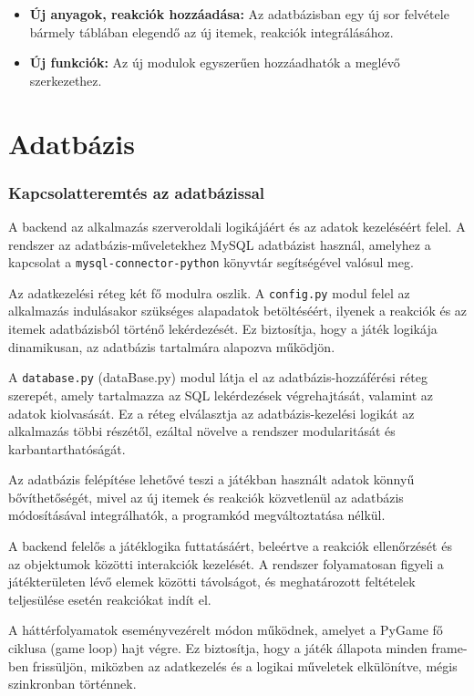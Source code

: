 \documentclass[]{thesis-ekf}
\begin{document}
	\begin{itemize}
		\item \textbf{Új anyagok, reakciók hozzáadása:} Az adatbázisban egy új sor felvétele bármely táblában elegendő az új itemek, reakciók integrálásához.
		
		\item \textbf{Új funkciók:} Az új modulok egyszerűen hozzáadhatók a meglévő szerkezethez.
	\end{itemize}
	
	\section{Adatbázis}
	\subsubsection{Kapcsolatteremtés az adatbázissal}
	
	A backend az alkalmazás szerveroldali logikájáért és az adatok kezeléséért felel. A rendszer az adatbázis-műveletekhez MySQL adatbázist használ, amelyhez a kapcsolat a \texttt{mysql-connector-python} könyvtár segítségével valósul meg.
	
	Az adatkezelési réteg két fő modulra oszlik. A \texttt{config.py} modul felel az alkalmazás indulásakor szükséges alapadatok betöltéséért, ilyenek a reakciók és az itemek adatbázisból történő lekérdezését. Ez biztosítja, hogy a játék logikája dinamikusan, az adatbázis tartalmára alapozva működjön.
	
	A \texttt{database.py} (dataBase.py) modul látja el az adatbázis-hozzáférési réteg szerepét, amely tartalmazza az SQL lekérdezések végrehajtását, valamint az adatok kiolvasását. Ez a réteg elválasztja az adatbázis-kezelési logikát az alkalmazás többi részétől, ezáltal növelve a rendszer modularitását és karbantarthatóságát.
	
	Az adatbázis felépítése lehetővé teszi a játékban használt adatok könnyű bővíthetőségét, mivel az új itemek és reakciók közvetlenül az adatbázis módosításával integrálhatók, a programkód megváltoztatása nélkül.
	
	A backend felelős a játéklogika futtatásáért, beleértve a reakciók ellenőrzését és az objektumok közötti interakciók kezelését. A rendszer folyamatosan figyeli a játékterületen lévő elemek közötti távolságot, és meghatározott feltételek teljesülése esetén reakciókat indít el.
	
	A háttérfolyamatok eseményvezérelt módon működnek, amelyet a PyGame fő ciklusa (game loop) hajt végre. Ez biztosítja, hogy a játék állapota minden frame-ben frissüljön, miközben az adatkezelés és a logikai műveletek elkülönítve, mégis szinkronban történnek.
\end{document}
